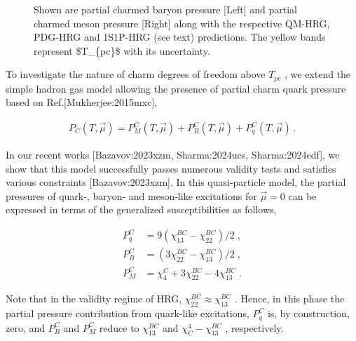 \documentclass[11pt,a4paper]{article}
\begin{document}
\begin{figure}[h]
\caption{Shown are partial charmed baryon pressure [Left] and partial charmed meson pressure [Right] along with the respective QM-HRG, PDG-HRG and 1S1P-HRG (see text) predictions. The yellow bands represent  \$T\_\{pc\}\$  with its uncertainty.}
\end{figure}

\begin{figure}[h]
\end{figure}

To investigate the nature of charm degrees of freedom above   $T_{pc}$ , we extend the simple hadron gas model allowing the presence of partial charm quark pressure based on Ref.[Mukherjee:2015mxc],

$$\begin{align}
	P_C(T,\vec{\mu})=P^C_{M}(T,\vec{\mu})+P^C_{B}(T,\vec{\mu})+P^C_{q}(T,\vec{\mu}) \, .
	
\end{align}$$

In our recent works [Bazavov:2023xzm, Sharma:2024ucs, Sharma:2024edf], we show that this model successfully passes numerous validity tests and satisfies various constraints [Bazavov:2023xzm]. In this quasi-particle model, the partial pressures of quark-, baryon- and meson-like excitations for  $\vec{\mu}=0$  can be expressed in terms of the generalized susceptibilities as follows,

$$\begin{align}
	P^C_{q}&=9(\chi^{BC}_{13}-\chi^{BC}_{22})/2\; , 
	 	\\
	P^C_{B}&=(3\chi^{BC}_{22}-\chi^{BC}_{13})/2\; , 
	\\
	P^C_{M}&=\chi^{C}_{4}+3\chi^{BC}_{22}-4\chi^{BC}_{13} \; .
	
\end{align}$$

Note that in the validity regime of HRG,  $\chi^{BC}_{22}\approx\chi^{BC}_{13}$ . Hence, in this phase the partial pressure contribution from quark-like excitations,  $P^C_q$  is, by construction, zero, and  $P^C_B$  and  $P^C_M$  reduce to  $\chi^{BC}_{13}$  and  $\chi^4_C-\chi^{BC}_{13}$ , respectively.
\end{document}
